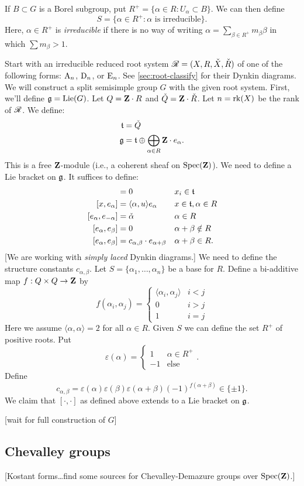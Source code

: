 If $B\subset G$ is a Borel subgroup, put 
$R^+=\{\alpha\in R:U_\alpha\subset B\}$. We can then define 
\[
  S = \{\alpha\in R^+:\alpha\text{ is irreducible}\} .
\]
Here, $\alpha\in R^+$ is \emph{irreducible} if there is no way of writing 
$\alpha=\sum_{\beta\in R^+} m_\beta \beta$ in which $\sum m_\beta>1$. 

Start with an irreducible reduced root system $\mathscr{R}=(X,R,\check X,\check R)$ of 
one of the following forms: $\mathrm{A}_n$, $\mathrm{D}_n$, or $\mathrm{E}_n$. See 
\autoref{sec:root-classify} for their Dynkin diagrams. We will construct a 
split semisimple group $G$ with the given root system. First, we'll define 
$\mathfrak{g}=\operatorname{Lie}(G)$. Let $Q=\mathbf{Z}\cdot R$ and $\check Q=\mathbf{Z}\cdot \check R$. Let 
$n=\operatorname{rk}(X)$ be the rank of $\mathscr{R}$. We define: 
\begin{align*}
  \mathfrak{t} &= \check Q \\
  \mathfrak{g} &= \mathfrak{t}\oplus \bigoplus_{\alpha\in R} \mathbf{Z}\cdot e_\alpha .
\end{align*}
This is a free $\mathbf{Z}$-module (i.e., a coherent sheaf on $\operatorname{Spec}(\mathbf{Z})$). We 
need to define a Lie bracket on $\mathfrak{g}$. It suffices to define: 
\begin{align*}
  [x_1,x_2] &= 0 && x_i\in \ft \\
  [x,e_\alpha] &= \langle \alpha,u\rangle e_\alpha && x\in \ft, \alpha\in R \\
  [e_\alpha,e_{-\alpha}] &= \check\alpha && \alpha\in R \\
  [e_\alpha,e_\beta] &= 0 && \alpha+\beta\notin R \\
  [e_\alpha,e_\beta] &= c_{\alpha,\beta} \cdot e_{\alpha+\beta} && \alpha+\beta\in R .
\end{align*}
[We are working with \emph{simply laced} Dynkin diagrams.] We need to define 
the structure constants $c_{\alpha,\beta}$. Let $S=\{\alpha_1,\dots,\alpha_n\}$ 
be a base for $R$. Define a bi-additive map $f:Q\times Q\to \mathbf{Z}$ by 
\[
  f(\alpha_i,\alpha_j) = \begin{cases} \langle \alpha_i,\alpha_j\rangle & i<j \\ 0 & i>j \\ 1 & i=j \end{cases} 
\]
Here we assume $\langle\alpha,\alpha\rangle=2$ for all $\alpha\in R$. Given $S$ 
we can define the set $R^+$ of positive roots. Put 
\[
  \varepsilon(\alpha) = \begin{cases} 1 & \alpha\in R^+ \\ -1 & \text{else} \end{cases} .
\]
Define 
\[
  c_{\alpha,\beta} = \varepsilon(\alpha)\varepsilon(\beta) \varepsilon(\alpha+\beta) (-1)^{f(\alpha+\beta)}\in \{\pm 1\} .
\]
We claim that $[\cdot,\cdot]$ as defined above extends to a Lie bracket on 
$\mathfrak{g}$. 

[wait for full construction of $G$]





\subsection{Chevalley groups}

[Kostant forms\ldots find some sources for Chevalley-Demazure groups over 
$\operatorname{Spec}(\mathbf{Z})$.]





